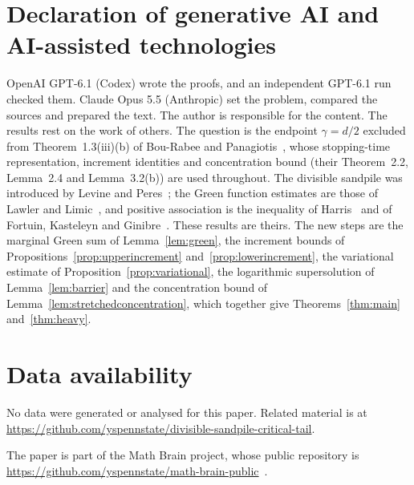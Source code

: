 \documentclass[11pt]{amsart}
\theoremstyle{remark}
\begin{document}
\section*{Declaration of generative AI and AI-assisted technologies}
OpenAI GPT-6.1 (Codex) wrote the proofs, and an independent GPT-6.1 run
checked them. Claude Opus 5.5 (Anthropic) set the problem, compared the
sources and prepared the text. The author is responsible for the content.
The results rest on the work of others. The question is the endpoint
$\gamma=d/2$ excluded from Theorem~1.3(iii)(b) of Bou-Rabee and
Panagiotis~\cite{BP}, whose stopping-time representation, increment
identities and concentration bound (their Theorem~2.2, Lemma~2.4 and
Lemma~3.2(b)) are used throughout. The divisible sandpile was introduced by
Levine and Peres~\cite{LP}; the Green function estimates are those of Lawler
and Limic~\cite{LL}, and positive association is the inequality of
Harris~\cite{Harris} and of Fortuin, Kasteleyn and Ginibre~\cite{FKG}.
These results are theirs. The new steps are the marginal Green sum of
Lemma~\ref{lem:green}, the increment bounds of
Propositions~\ref{prop:upperincrement} and~\ref{prop:lowerincrement}, the
variational estimate of Proposition~\ref{prop:variational}, the logarithmic
supersolution of Lemma~\ref{lem:barrier} and the concentration bound of
Lemma~\ref{lem:stretchedconcentration}, which together give
Theorems~\ref{thm:main} and~\ref{thm:heavy}.

\section*{Data availability}
No data were generated or analysed for this paper. Related material is at
\url{https://github.com/yspennstate/divisible-sandpile-critical-tail}.

The paper is part of the Math Brain project, whose public repository is \url{https://github.com/yspennstate/math-brain-public}~\cite{MathBrainRepo}.
\end{document}
